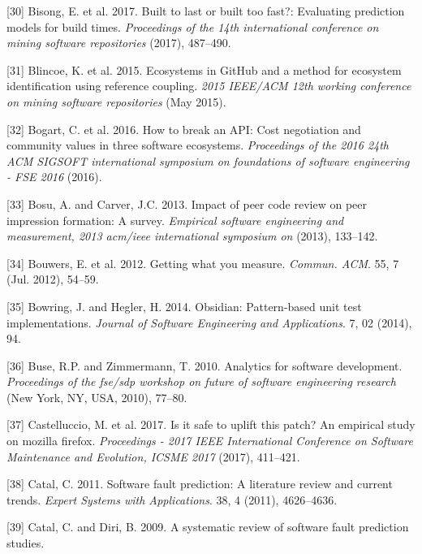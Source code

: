 \documentclass[]{book}
\begin{document}
\hypertarget{ref-bisong2017built}{}
{[}30{]} Bisong, E. et al. 2017. Built to last or built too fast?:
Evaluating prediction models for build times. \emph{Proceedings of the
14th international conference on mining software repositories} (2017),
487--490.

\hypertarget{ref-Blincoe2015}{}
{[}31{]} Blincoe, K. et al. 2015. Ecosystems in GitHub and a method for
ecosystem identification using reference coupling. \emph{2015 IEEE/ACM
12th working conference on mining software repositories} (May 2015).

\hypertarget{ref-Bogart2016}{}
{[}32{]} Bogart, C. et al. 2016. How to break an API: Cost negotiation
and community values in three software ecosystems. \emph{Proceedings of
the 2016 24th ACM SIGSOFT international symposium on foundations of
software engineering - FSE 2016} (2016).

\hypertarget{ref-bosu2013impact}{}
{[}33{]} Bosu, A. and Carver, J.C. 2013. Impact of peer code review on
peer impression formation: A survey. \emph{Empirical software
engineering and measurement, 2013 acm/ieee international symposium on}
(2013), 133--142.

\hypertarget{ref-bouwers2012a}{}
{[}34{]} Bouwers, E. et al. 2012. Getting what you measure.
\emph{Commun. ACM}. 55, 7 (Jul. 2012), 54--59.

\hypertarget{ref-bowring2014obsidian}{}
{[}35{]} Bowring, J. and Hegler, H. 2014. Obsidian: Pattern-based unit
test implementations. \emph{Journal of Software Engineering and
Applications}. 7, 02 (2014), 94.

\hypertarget{ref-Buse10}{}
{[}36{]} Buse, R.P. and Zimmermann, T. 2010. Analytics for software
development. \emph{Proceedings of the fse/sdp workshop on future of
software engineering research} (New York, NY, USA, 2010), 77--80.

\hypertarget{ref-castelluccio2017a}{}
{[}37{]} Castelluccio, M. et al. 2017. Is it safe to uplift this patch?
An empirical study on mozilla firefox. \emph{Proceedings - 2017 IEEE
International Conference on Software Maintenance and Evolution, ICSME
2017} (2017), 411--421.

\hypertarget{ref-Catal2011}{}
{[}38{]} Catal, C. 2011. Software fault prediction: A literature review
and current trends. \emph{Expert Systems with Applications}. 38, 4
(2011), 4626--4636.

\hypertarget{ref-Catal2009review}{}
{[}39{]} Catal, C. and Diri, B. 2009. A systematic review of software
fault prediction studies.
\end{document}
